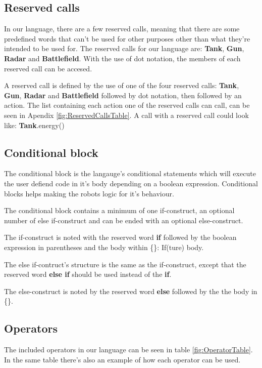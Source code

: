 \subsection{Reserved calls}
In our language, there are a few reserved calls, meaning that there are some predefined words that can’t be used for other purposes other than what they’re intended to be used for. The reserved calls for our language are: \textbf{Tank}, \textbf{Gun}, \textbf{Radar} and \textbf{Battlefield}. With the use of dot notation, the members of each reserved call can be accesed.  

\begin{defi}
A reserved call is defined by the use of one of the four reserved calls: \textbf{Tank}, \textbf{Gun}, \textbf{Radar} and \textbf{Battlefield} followed by dot notation, then followed by an action. The list containing each action one of the reserved calls can call, can be seen in Apendix \ref{fig:ReservedCallsTable}. \newline
A call with a reserved call could look like: \textbf{Tank}.energy()
\end{defi}

\subsection{Conditional block}
The conditional block is the langauge's conditional statements which will execute the user defiend code in it's body depending on a boolean expression. Conditional blocks helps making the robots logic for it's behaviour. 

\begin{defi}
The conditional block contains a minimum of one if-construct, an optional number of else if-construct and can be ended with an optional else-construct. 

The if-construct is noted with the reserved word \textbf{if} followed by the boolean expression in parentheses and the body within \{\}: If(ture) {body}.

The else if-contruct's structure is the same as the if-construct, except that the reserved  word \textbf{else if} should be used instead of the \textbf{if}. 

The else-construct is noted by the reserved word \textbf{else} followed by the the body in \{\}.
\end{defi}

\subsection{Operators}
The included operators in our language can be seen in table \ref{fig:OperatorTable}. In the same table there's also an example of how each operator can be used.

